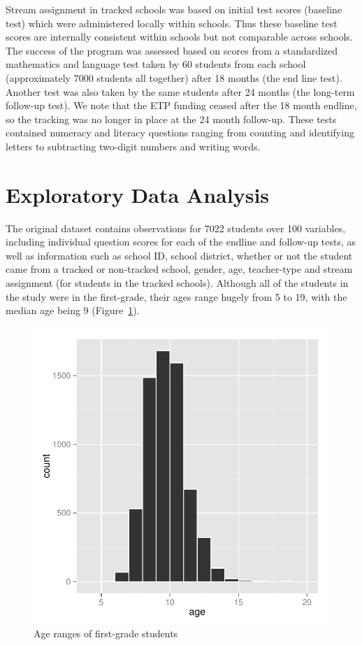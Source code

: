 \documentclass[11pt]{article}
\begin{document}
Stream assignment in tracked schools was based on initial test scores (baseline test) which were administered locally within schools. Thus these baseline test scores are internally consistent within schools but not comparable across schools. The success of the program was assessed based on scores from a standardized mathematics and language test taken by 60 students from each school (approximately 7000 students all together) after 18 months (the end line test). Another test was also taken by the same students after 24 months (the long-term follow-up test). We note that the ETP funding ceased after the 18 month endline, so the tracking was no longer in place at the 24 month follow-up. These tests contained numeracy and literacy questions ranging from counting and identifying letters to subtracting two-digit numbers and writing words.
 
 \section{Exploratory Data Analysis}
 The original dataset contains observations for 7022 students over 100 variables, including individual question scores for each of the endline and follow-up tests, as well as information such as school ID, school district, whether or not the student came from a tracked or non-tracked school, gender, age, teacher-type and stream assignment (for students in the tracked schools). Although all of the students in the study were in the first-grade, their ages range hugely from 5 to 19, with the median age being 9 (Figure~\ref{fig:age}).
 
  \begin{figure}[h]
 \centering
 \includegraphics[scale=0.6]{age.pdf}
 \caption{Age ranges of first-grade students}
 \label{fig:age}
 \end{figure} 
 
\end{document}
